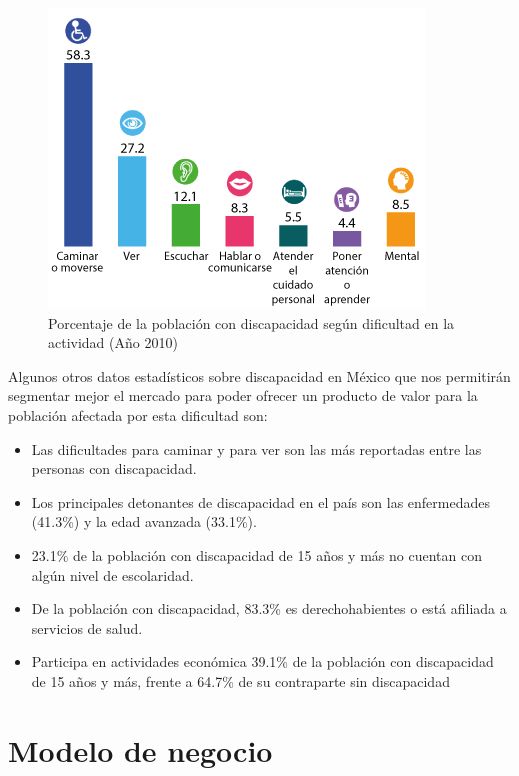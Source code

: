 \begin{figure}[th]
	\centering
	\includegraphics[width=.8\textwidth]{Figures/dificultad.png}
	\decoRule
	\caption{Porcentaje de la poblaci\'on con discapacidad seg\'un dificultad en la actividad (Año 2010)}
	\label{fig:elproceso}
\end{figure}

Algunos otros datos estad\'isticos sobre discapacidad en M\'exico que nos permitir\'an segmentar mejor el mercado para poder ofrecer un producto de valor para la poblaci\'on afectada por esta dificultad son:

\begin{itemize}
\item Las dificultades para caminar y para ver son las m\'as reportadas entre las personas con discapacidad.
\item Los principales detonantes de discapacidad en el pa\'is son las enfermedades (41.3\%) y la edad avanzada (33.1\%).
\item 23.1\% de la poblaci\'on con discapacidad de 15 años y m\'as no cuentan con alg\'un nivel de escolaridad.
\item De la poblaci\'on con discapacidad, 83.3\% es derechohabientes o est\'a afiliada a servicios de salud.
\item Participa en actividades económica 39.1\% de la poblaci\'on con discapacidad de 15 años y más, frente a 64.7\% de su contraparte sin discapacidad
\end{itemize}


\section{Modelo de negocio}

